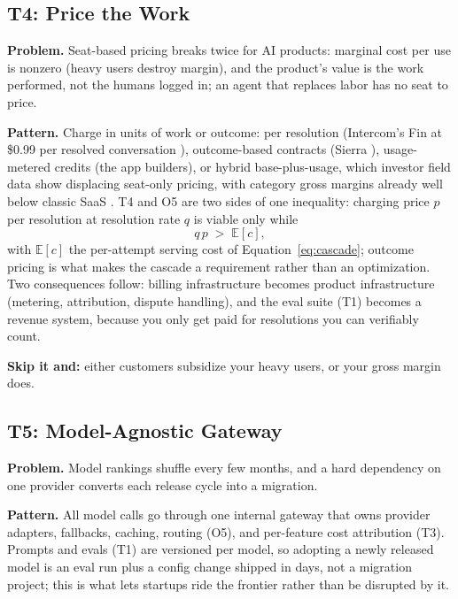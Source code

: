 \documentclass[11pt]{article}
\begin{document}
\subsection{T4: Price the Work}

\textbf{Problem.} Seat-based pricing breaks twice for AI products: marginal
cost per use is nonzero (heavy users destroy margin), and the product's value
is the work performed, not the humans logged in; an agent that replaces labor
has no seat to price.

\textbf{Pattern.} Charge in units of work or outcome: per resolution
(Intercom's Fin at \$0.99 per resolved conversation \citep{intercom2026fin}),
outcome-based contracts (Sierra \citep{sierra2024outcomes}), usage-metered
credits (the app builders), or hybrid base-plus-usage, which investor field
data show displacing seat-only pricing, with category gross margins already
well below classic SaaS \citep{bvp2026pricing}. T4 and O5 are two sides of
one inequality: charging price $p$ per resolution at resolution rate $q$ is
viable only while
\begin{equation}
q\,p \;>\; \mathbb{E}[c],
\label{eq:unit}
\end{equation}
with $\mathbb{E}[c]$ the per-attempt serving cost of
Equation~\ref{eq:cascade}; outcome pricing is what makes the cascade a
requirement rather than an optimization. Two consequences follow: billing infrastructure
becomes product infrastructure (metering, attribution, dispute handling), and
the eval suite (T1) becomes a revenue system, because you only get paid for
resolutions you can verifiably count.

\textbf{Skip it and:} either customers subsidize your heavy users, or your
gross margin does.

\subsection{T5: Model-Agnostic Gateway}

\textbf{Problem.} Model rankings shuffle every few months, and a hard
dependency on one provider converts each release cycle into a migration.

\textbf{Pattern.} All model calls go through one internal gateway that owns
provider adapters, fallbacks, caching, routing (O5), and per-feature cost
attribution (T3). Prompts and evals (T1) are versioned per model, so
adopting a newly released model is an eval run plus a config change shipped
in days, not a migration project; this is what lets startups ride the
frontier rather than be disrupted by it.
\end{document}
